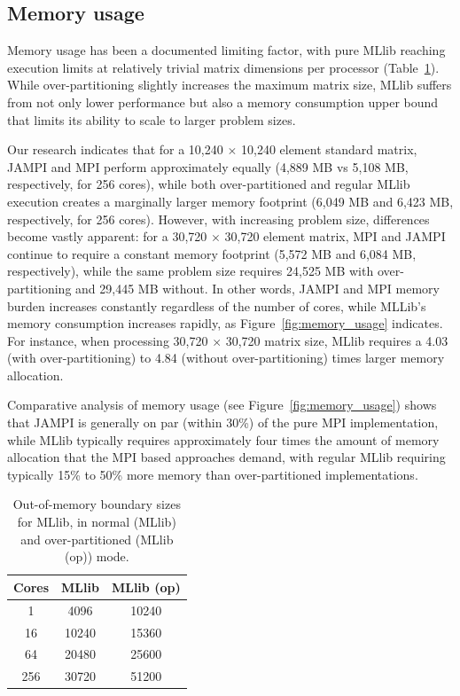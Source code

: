 \documentclass[bdcc,article,submit,moreauthors,pdftex]{Definitions/mdpi}
\begin{document}
\subsection{Memory usage} %
\label{sub:memory_usage}

Memory usage has been a documented limiting factor, with pure MLlib reaching execution limits at relatively trivial matrix dimensions per processor (Table~\ref{tab:out_of_memory}). While over-partitioning slightly increases the maximum matrix size, MLlib suffers from not only lower performance but also a memory consumption upper bound that limits its ability to scale to larger problem sizes.

Our research indicates that for a 10,240 $\times$ 10,240 element standard matrix, JAMPI and MPI perform approximately equally (4,889 MB vs 5,108 MB, respectively, for 256 cores), while both over-partitioned and regular MLlib execution creates a marginally larger memory footprint (6,049 MB and 6,423 MB, respectively, for 256 cores).  However, with increasing problem size, differences become vastly apparent: for a 30,720 $\times$ 30,720 element matrix, MPI and JAMPI continue to require a constant memory footprint (5,572 MB and 6,084 MB, respectively), while the same problem size requires 24,525 MB with over-partitioning and 29,445 MB without. In other words, JAMPI and MPI memory burden increases constantly regardless of the number of cores, while MLLib's memory consumption increases rapidly, as Figure~\ref{fig:memory_usage} indicates. For instance, when processing 30,720 $\times$ 30,720 matrix size, MLlib requires a 4.03 (with over-partitioning) to 4.84 (without over-partitioning) times larger memory allocation.

Comparative analysis of memory usage (see Figure~\ref{fig:memory_usage}) shows that JAMPI is generally on par (within 30\%) of the pure MPI implementation, while MLlib typically requires approximately four times the amount of memory allocation that the MPI based approaches demand, with regular MLlib requiring typically 15\% to 50\% more memory than over-partitioned implementations.

\begin{table}
	\centering
	\begin{tabular}{ |c|c|c| } 
	 \hline
	 Cores & MLlib & MLlib (op)  \\ 
	 \hline\hline
	 1 & 4096 & 10240 \\ 
	 \hline
	 16 & 10240 & 15360 \\ 
	 \hline
	 64 & 20480 & 25600 \\ 
	 \hline
	 256 & 30720 & 51200 \\ 
	 \hline
	\end{tabular}
	\caption{Out-of-memory boundary sizes for MLlib, in normal (MLlib) and over-partitioned (MLlib (op)) mode.}
	\label{tab:out_of_memory}
\end{table}
	
\end{document}
